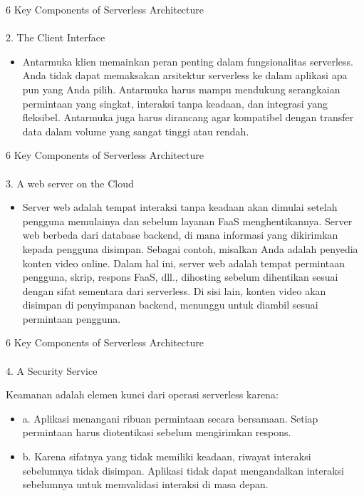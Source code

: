 \documentclass[aspectratio=169, table]{beamer}
\begin{document}
	\begin{frame}{6 Key Components of Serverless Architecture}
			\framesubtitle{\hspace{1cm}}
		2. The Client Interface
		\begin{itemize}
			\item 
			Antarmuka klien memainkan peran penting dalam fungsionalitas serverless. Anda tidak dapat memaksakan arsitektur serverless ke dalam aplikasi apa pun yang Anda pilih. 
			Antarmuka harus mampu mendukung serangkaian permintaan yang singkat, interaksi tanpa keadaan, dan integrasi yang fleksibel. 
			Antarmuka juga harus dirancang agar kompatibel dengan transfer data dalam volume yang sangat tinggi atau rendah.
		\end{itemize}
	\end{frame}
	
	\begin{frame}{6 Key Components of Serverless Architecture}
			\framesubtitle{\hspace{1cm}}
		3. A web server on the Cloud
		\begin{itemize}
			\item Server web adalah tempat interaksi tanpa keadaan akan dimulai setelah pengguna memulainya dan sebelum layanan FaaS menghentikannya. 
			Server web berbeda dari database backend, di mana informasi yang dikirimkan kepada pengguna disimpan. Sebagai contoh, misalkan Anda adalah penyedia konten video online. 
			Dalam hal ini, server web adalah tempat permintaan pengguna, skrip, respons FaaS, dll., dihosting sebelum dihentikan sesuai dengan sifat sementara dari serverless.
			Di sisi lain, konten video akan disimpan di penyimpanan backend, menunggu untuk diambil sesuai permintaan pengguna.
		\end{itemize}
	\end{frame}
	
	\begin{frame}{6 Key Components of Serverless Architecture}
			\framesubtitle{\hspace{1cm}}
		4. A Security Service
		
		Keamanan adalah elemen kunci dari operasi serverless karena:
		\begin{itemize}
			\item a. Aplikasi menangani ribuan permintaan secara bersamaan. Setiap permintaan harus diotentikasi sebelum mengirimkan respons.
			\item b. Karena sifatnya yang tidak memiliki keadaan, riwayat interaksi sebelumnya tidak disimpan. Aplikasi tidak dapat mengandalkan interaksi sebelumnya untuk memvalidasi interaksi di masa depan.
		
		
		\end{itemize}
	\end{frame}
	
\end{document}
